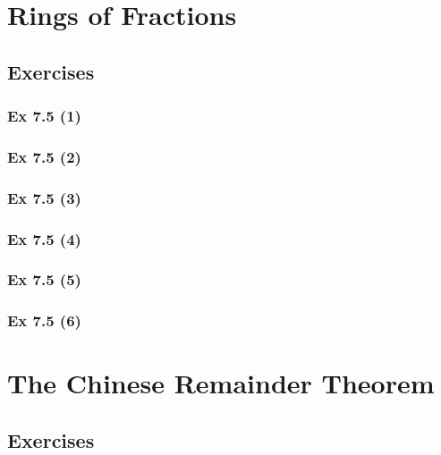 \newpage		%

\section{Rings of Fractions}\label{sec:7.5}	
\subsection*{Exercises}\label{sec:7.5_Exercises}

\subsubsection{Ex 7.5 (1)}\label{sec:Ex_7.5.1}

\subsubsection{Ex 7.5 (2)}\label{sec:Ex_7.5.2}

\subsubsection{Ex 7.5 (3)}\label{sec:Ex_7.5.3}

\subsubsection{Ex 7.5 (4)}\label{sec:Ex_7.5.4}

\subsubsection{Ex 7.5 (5)}\label{sec:Ex_7.5.5}

\subsubsection{Ex 7.5 (6)}\label{sec:Ex_7.5.6}

\newpage		%

\section{The Chinese Remainder Theorem}\label{sec:7.6}	
\subsection*{Exercises}\label{sec:7.6_Exercises}

